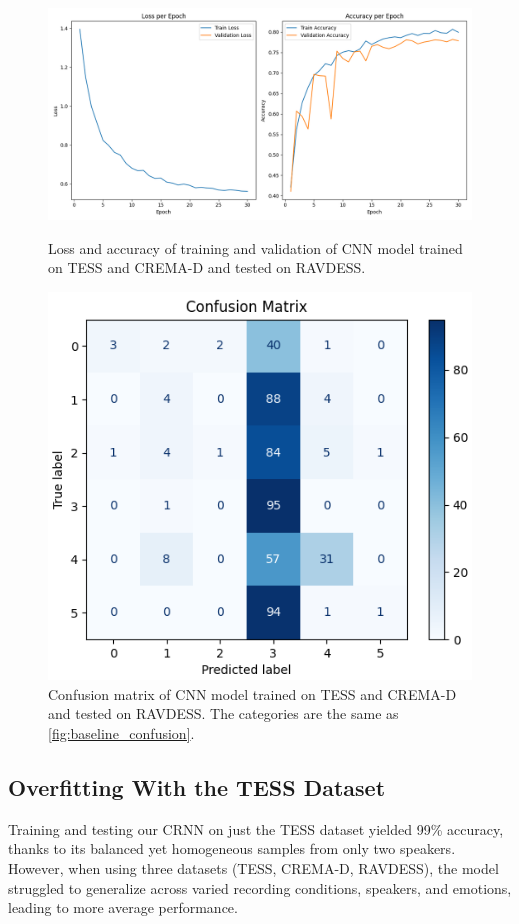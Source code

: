 \documentclass[../main.tex]{subfiles}
\begin{document}
\begin{figure}[ht]
    \centering
    \begin{minipage}{.5\textwidth}
      \centering
      \includegraphics[width=1.0\linewidth]{../resources/cnn_unmixed.png}
      \caption{Loss and accuracy of training and validation of CNN model trained on 
      TESS and CREMA-D and tested on RAVDESS.}
      \label{fig:cnn_unmixed}
    \end{minipage}%
    \hfill
    \begin{minipage}{.4\textwidth}
      \centering
      \includegraphics[width=.8\linewidth]{../resources/cnn_unmixed_confusion.png}
      \caption{Confusion matrix of CNN model trained on TESS and CREMA-D 
      and tested on RAVDESS. The categories are the same as 
      \autoref{fig:baseline_confusion}.} 
      \label{fig:cnn_unmixed_confusion}
    \end{minipage}
\end{figure}

\subsection{Overfitting With the TESS Dataset}

Training and testing our CRNN on just the TESS dataset yielded 99\% accuracy, 
thanks to its balanced yet homogeneous samples from only two speakers. However, 
when using three datasets (TESS, CREMA-D, RAVDESS), the model struggled to 
generalize across varied recording conditions, speakers, and emotions, leading 
to more average performance.
\end{document}

